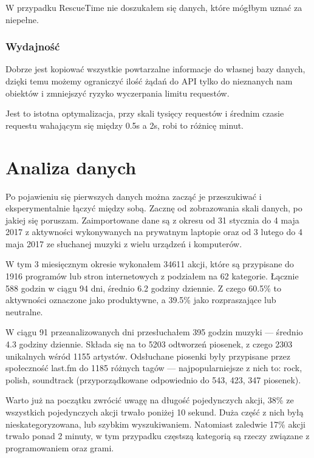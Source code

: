 \documentclass[brudnopis]{xmgr}
\begin{document}
        W przypadku RescueTime nie doszukałem się danych, które mógłbym uznać za niepełne.

        \subsection*{Wydajność}
        Dobrze jest kopiować wszystkie powtarzalne informacje do własnej bazy danych,
        dzięki temu możemy ograniczyć ilość żądań do API tylko do nieznanych nam obiektów i zmniejszyć ryzyko wyczerpania limitu requestów.

		Jest to istotna optymalizacja, przy skali tysięcy requestów i średnim czasie requestu wahającym się między 0.5s a 2s,
		robi to różnicę minut.

\chapter{Analiza danych}

	Po pojawieniu się pierwszych danych można zacząć je przeszukiwać i eksperymentalnie łączyć między sobą.
	Zacznę od zobrazowania skali danych, po jakiej się poruszam.
	Zaimportowane dane są z okresu od 31 stycznia do 4 maja 2017 z aktywności wykonywanych na prywatnym laptopie
	oraz od 3 lutego do 4 maja 2017 ze słuchanej muzyki z wielu urządzeń i komputerów.

	W tym 3 miesięcznym okresie wykonałem 34611 akcji, które są przypisane do 1916 programów lub stron internetowych z podziałem na 62 kategorie.
	Łącznie 588 godzin w ciągu 94 dni, średnio 6.2 godziny dziennie.
	Z czego 60.5\% to aktywności oznaczone jako produktywne, a 39.5\% jako rozpraszające lub neutralne.

	W ciągu 91 przeanalizowanych dni przesłuchałem 395 godzin muzyki — średnio 4.3 godziny dziennie.
	Składa się na to 5203 odtworzeń piosenek, z czego 2303 unikalnych wśród 1155 artystów.
	Odsłuchane piosenki były przypisane przez społeczność last.fm do 1185 różnych tagów — najpopularniejsze z nich to: rock, polish, soundtrack
	(przyporządkowane odpowiednio do 543, 423, 347 piosenek).

	Warto już na początku zwrócić uwagę na długość pojedynczych akcji, 38\% ze wszystkich pojedynczych akcji trwało poniżej 10 sekund. %
	Duża część z nich byłą nieskategoryzowana, lub szybkim wyszukiwaniem.
	Natomiast zaledwie 17\% akcji trwało ponad 2 minuty, w tym przypadku częstszą kategorią są rzeczy związane z programowaniem oraz grami.
\end{document}
